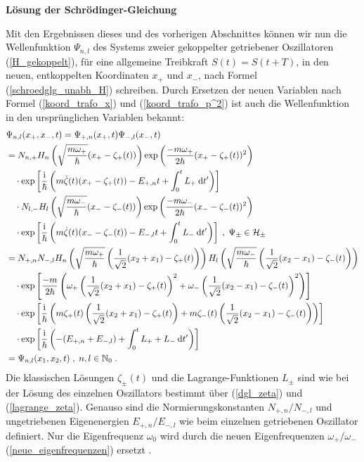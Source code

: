   \textbf{Lösung der Schrödinger-Gleichung}

  Mit den Ergebnissen dieses und des vorherigen Abschnittes können wir nun die Wellenfunktion $\Psi_{n,l}$ des Systems zweier gekoppelter getriebener Oszillatoren (\ref{H_gekoppelt}), für eine allgemeine Treibkraft $S(t)=S(t+T)$, in den neuen, entkoppelten Koordinaten $x_+$ und $x_-$, nach Formel (\ref{schroedglg_unabh_H}) schreiben.
  Durch Ersetzen der neuen Variablen nach Formel (\ref{koord_trafo_x}) und (\ref{koord_trafo_p^2}) ist auch die Wellenfunktion in den ursprünglichen Variablen bekannt:
  \begin{align}
     &\Psi_{n,l}(x_+,x_-,t) = \Psi_{+,n}(x_+,t)\Psi_{-,l}(x_-,t) \notag\\
     &=N_{n,+}H_n\left(\sqrt{\frac{m\omega_+}{\hbar}}(x_+-\zeta_+(t))\right) \exp\left(\frac{-m\omega_+}{2\hbar}(x_+-\zeta_+(t))^2\right)\notag\\
     &\quad \cdot \exp\left[\frac{\text i}{\hbar}\left(m\dot \zeta(t)(x_+-\zeta_+(t))-E_{+,n}t+\int_0^tL_+\:\text dt'\right)\right] \quad\quad\quad\notag\\
     &\quad \cdot N_{l,-}H_l\left(\sqrt{\frac{m\omega_-}{\hbar}}(x_--\zeta_-(t))\right) \exp\left(\frac{-m\omega_-}{2\hbar}(x_--\zeta_-(t))^2\right)\notag\\
     &\quad \cdot \exp\left[\frac{\text i}{\hbar}\left(m\dot \zeta(t)(x_--\zeta_-(t))-E_{-,l}t+\int_0^tL_-\:\text dt'\right)\right] \;,\; \Psi_\pm \in \cal H_\pm \notag\\
    &= N_{+,n}N_{-,l} H_n\left(\sqrt{\frac{m\omega_+}{\hbar}}\left(\frac{1}{\sqrt{2}}(x_2+x_1)-\zeta_+(t)\right)\right)H_l\left(\sqrt{\frac{m\omega_-}{\hbar}}\left(\frac{1}{\sqrt{2}}(x_2-x_1)-\zeta_-(t)\right)\right) \notag\\
    &\quad\cdot \exp\left[\frac{-m}{2\hbar}\left(\omega_+\left(\frac{1}{\sqrt{2}}(x_2+x_1)-\zeta_+(t)\right)^2 + \omega_-\left(\frac{1}{\sqrt{2}}(x_2-x_1)-\zeta_-(t)\right)^2\right)\right] \notag\\
    &\quad\cdot \exp\left[\frac{\text i}{\hbar} \left(m\zeta_+(t)\left(\frac{1}{\sqrt{2}}(x_2+x_1)-\zeta_+(t)\right) + m\zeta_-(t)\left(\frac{1}{\sqrt{2}}(x_2-x_1)-\zeta_-(t)\right)\right) \right] \notag\\
    &\quad\cdot \exp \left[\frac{\text i}{\hbar}\left(-(E_{+,n}+E_{-,l})+\int_0^tL_++L_-\:\text dt'\right)\right] \notag\\
    &=\Psi_{n,l}(x_1,x_2,t) \; , \; n,l \in \mathbb N_0 \; .
  \end{align}
  Die klassischen Lösungen $\zeta_\pm(t)$ und die Lagrange-Funktionen $L_\pm$ sind wie bei der Lösung des einzelnen Oszillators bestimmt über (\ref{dgl_zeta}) und (\ref{lagrange_zeta}).
  Genauso sind die Normierungskonstanten $N_{+,n}/N_{-,l}$ und ungetriebenen Eigenenergien $E_{+,n}/E_{-,l}$ wie beim einzelnen getriebenen Oszillator definiert.
  Nur die Eigenfrequenz $\omega_0$ wird durch die neuen Eigenfrequenzen $\omega_+/\omega_-$ (\ref{neue_eigenfrequenzen}) ersetzt .

